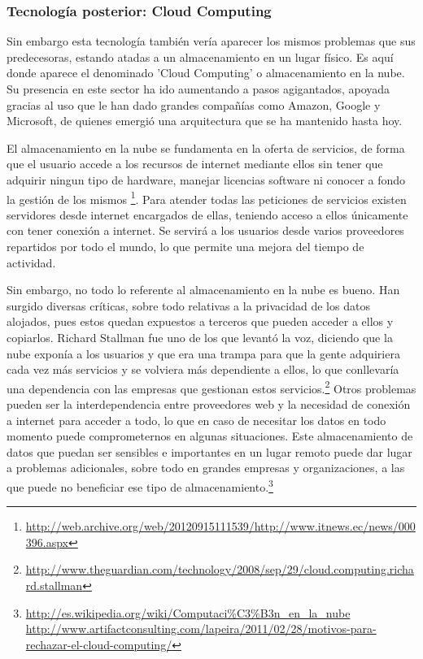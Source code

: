 \documentclass[a4paper, 10pt]{article} %
\begin{document}
\subsubsection{Tecnología posterior: Cloud Computing}

Sin embargo esta tecnología también vería aparecer los mismos problemas que sus predecesoras, estando atadas a un almacenamiento en un lugar físico. Es aquí donde aparece el denominado 'Cloud Computing' o almacenamiento en la nube. Su presencia en este sector ha ido aumentando a pasos agigantados, apoyada gracias al uso que le han dado grandes compañías como Amazon, Google y Microsoft, de quienes emergió una arquitectura que se ha mantenido hasta hoy.  

El almacenamiento en la nube se fundamenta en la oferta de servicios, de forma que el usuario accede a los recursos de internet mediante ellos sin tener que adquirir ningun tipo de hardware, manejar licencias software ni conocer a fondo la gestión de los mismos \footnote{\url{http://web.archive.org/web/20120915111539/http://www.itnews.ec/news/000396.aspx}}. Para atender todas las peticiones de servicios existen servidores desde internet encargados de ellas, teniendo acceso a ellos únicamente con tener conexión a internet. Se servirá a los usuarios desde varios proveedores repartidos por todo el mundo, lo que permite una mejora del tiempo de actividad.

Sin embargo, no todo lo referente al almacenamiento en la nube es bueno. Han surgido diversas críticas, sobre todo relativas a la privacidad de los datos alojados, pues estos quedan expuestos a terceros que pueden acceder a ellos y copiarlos. Richard Stallman fue uno de los que levantó la voz, diciendo que la nube exponía a los usuarios y que era una trampa para que la gente adquiriera cada vez más servicios y se volviera más dependiente a ellos, lo que conllevaría una dependencia con las empresas que gestionan estos servicios.\footnote{\url{http://www.theguardian.com/technology/2008/sep/29/cloud.computing.richard.stallman}} Otros problemas pueden ser la interdependencia entre proveedores web y la necesidad de conexión a internet para acceder a todo, lo que en caso de necesitar los datos en todo momento puede comprometernos en algunas situaciones. Este almacenamiento de datos que puedan ser sensibles e importantes en un lugar remoto puede dar lugar a problemas adicionales, sobre todo en grandes empresas y  organizaciones, a las que puede no beneficiar ese tipo de almacenamiento.\footnote{\url{http://es.wikipedia.org/wiki/Computaci\%C3\%B3n_en_la_nube} \\ \url{http://www.artifactconsulting.com/lapeira/2011/02/28/motivos-para-rechazar-el-cloud-computing/}}
\end{document}
